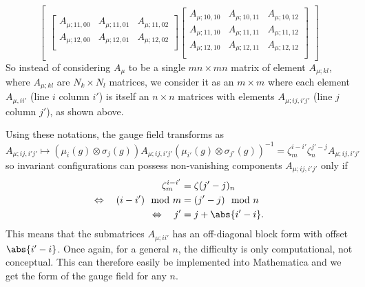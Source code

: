 \documentclass{worksheetclass}
\begin{document}
{\begin{equation}
\begin{bmatrix}
\begin{bmatrix}
                    A_{\mu;11,00} & A_{\mu;11,01} & A_{\mu;11,02}\\
                    A_{\mu;12,00} & A_{\mu;12,01} & A_{\mu;12,02}\\
                \end{bmatrix}
                \begin{bmatrix}
                A_{\mu;10,10} & A_{\mu;10,11} & A_{\mu;10,12}\\
                A_{\mu;11,10} & A_{\mu;11,11} & A_{\mu;11,12}\\
                A_{\mu;12,10} & A_{\mu;12,11} & A_{\mu;12,12}\\
            \end{bmatrix}
            \end{bmatrix}
        \end{equation}}
        So instead of considering $A_\mu$ to be a single $mn\times mn$ matrix of element $A_{\mu;kl}$, where $A_{\mu;kl}$ are $N_k\times N_l$ matrices, we consider it as an $m\times m$ where each element $A_{\mu,ii'}$ (line $i$ column $i'$) is itself an $n\times n$ matrices with elements $A_{\mu;ij,i'j'}$ (line $j$ column $j'$), as shown above.

        Using these notations, the gauge field transforms as
        \begin{equation}
            A_{\mu;ij,i'j'} \mapsto (\mu_i(g)\otimes\sigma_j(g))A_{\mu;ij,i'j'}(\mu_{i'}(g)\otimes\sigma_{j'}(g))^{-1} = \zeta^{i-i'}_m\zeta^{j'-j}_n A_{\mu;ij,i'j'}
        \end{equation}
        so invariant configurations can possess non-vanishing components $A_{\mu;ij,i'j'}$ only if
        \begin{align}
            \zeta^{i-i'}_m &= \zeta(j'-j)_n \\
            \Leftrightarrow\quad (i-i')\mod m &= (j'-j)\mod n \\
            \Leftrightarrow\quad j' &= j+\abs{i'-i}.
        \end{align}
        This means that the submatrices $A_{\mu;ii'}$ has an off-diagonal block form with offset $\abs{i'-i}$. Once again, for a general $n$, the difficulty is only computational, not conceptual. This can therefore easily be implemented into Mathematica and we get the form of the gauge field for any $n$.
\end{document}
